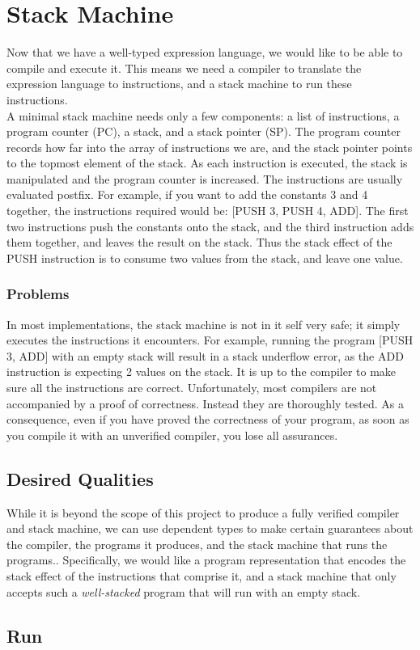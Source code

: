 \section{Stack Machine}
\label{sec:stack-machine}
Now that we have a well-typed expression language, we would like to be able to compile and execute it. This means we need a compiler to translate the expression language to instructions, and a stack machine to run these instructions.
\\
A minimal stack machine needs only a few components: a list of instructions, a program counter (PC), a stack, and a stack pointer (SP). The program counter records how far into the array of instructions we are, and the stack pointer points to the topmost element of the stack. As each instruction is executed, the stack is manipulated and the program counter is increased. The instructions are usually evaluated postfix. For example, if you want to add the constants 3 and 4 together, the instructions required would be: [PUSH 3, PUSH 4, ADD]. The first two instructions push the constants onto the stack, and the third instruction adds them together, and leaves the result on the stack. Thus the stack effect of the PUSH instruction is to consume two values from the stack, and leave one value.

\subsubsection{Problems}
In most implementations, the stack machine is not in it self very safe; it simply executes the instructions it encounters. For example, running the program [PUSH 3, ADD] with an empty stack will result in a stack underflow error, as the ADD instruction is expecting 2 values on the stack. It is up to the compiler to make sure all the instructions are correct. Unfortunately, most compilers are not accompanied by a proof of correctness. Instead they are thoroughly tested. As a consequence, even if you have proved the correctness of your program, as soon as you compile it with an unverified compiler, you lose all assurances. \cite{Leroy_formalverification}

\subsection{Desired Qualities}
While it is beyond the scope of this project to produce a fully verified compiler and stack machine, we can use dependent types to make certain guarantees about the compiler, the programs it produces, and the stack machine that runs the programs.. Specifically, we would like a program representation that encodes the stack effect of the instructions that comprise it, and a stack machine that only accepts such a \textit{well-stacked} program that will run with an empty stack.



\subsection{Run}
\label{sec:running_a_program}
